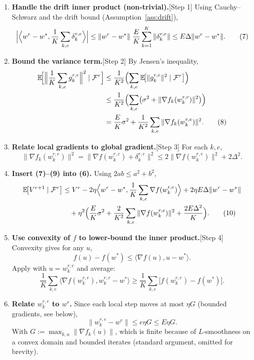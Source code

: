 \documentclass{article}
\newcommand{\E}{\mathbb{E}}
\begin{document}
\begin{enumerate}
\item \textbf{Handle the drift inner product (non‑trivial).}[Step 1]  
Using Cauchy–Schwarz and the drift bound (Assumption~\ref{ass:drift}),
\[
\Bigl|\Bigl\langle w^{r}-w^{*},\frac1K\sum_{k,e}\delta_{k}^{r,e}\Bigr\rangle\Bigr|
\le \|w^{r}-w^{*}\|\;\frac{E}{K}\sum_{k=1}^{K}\|\delta_{k}^{r,e}\|
\le E\Delta\|w^{r}-w^{*}\|.
\tag{7}
\]

\item \textbf{Bound the variance term.}[Step 2]  
By Jensen’s inequality,
\[
\begin{aligned}
\E\!\Bigl[\Bigl\|\frac1K\sum_{k,e}g_{k}^{r,e}\Bigr\|^{2}\mid\mathcal{F}^{r}\Bigr]
&\le \frac{1}{K^{2}}\Bigl(\sum_{k,e}\E\!\bigl[\|g_{k}^{r,e}\|^{2}\mid\mathcal{F}^{r}\bigr]\Bigr)\\
&\le \frac{1}{K^{2}}\Bigl(\sum_{k,e}\bigl(\sigma^{2}+\|\nabla f_k(w_{k}^{r,e})\|^{2}\bigr)\Bigr)\\
&= \frac{E}{K}\sigma^{2}
+\frac1{K^{2}}\sum_{k,e}\|\nabla f_k(w_{k}^{r,e})\|^{2}.
\tag{8}
\end{aligned}
\]

\item \textbf{Relate local gradients to global gradient.}[Step 3]  
For each $k,e$,
\[
\|\nabla f_k(w_{k}^{r,e})\|^{2}
= \|\nabla f(w_{k}^{r,e})+\delta_{k}^{r,e}\|^{2}
\le 2\|\nabla f(w_{k}^{r,e})\|^{2}+2\Delta^{2}.
\tag{9}
\]

\item \textbf{Insert (7)–(9) into (6).}  Using $2ab\le a^{2}+b^{2}$,
\[
\begin{aligned}
\E\!\bigl[V^{r+1}\mid\mathcal{F}^{r}\bigr]
&\le V^{r}
-2\eta\Bigl\langle w^{r}-w^{*},\frac1K\sum_{k,e}\nabla f(w_{k}^{r,e})\Bigr\rangle
+2\eta E\Delta\|w^{r}-w^{*}\|\\
&\quad+\eta^{2}\Bigl(\frac{E}{K}\sigma^{2}
+\frac{2}{K^{2}}\sum_{k,e}\|\nabla f(w_{k}^{r,e})\|^{2}
+ \frac{2E\Delta^{2}}{K}\Bigr).
\tag{10}
\end{aligned}
\]

\item \textbf{Use convexity of $f$ to lower‑bound the inner product.}[Step 4]  
Convexity gives for any $u$,
\[
f(u)-f(w^{*})\le \langle\nabla f(u),u-w^{*}\rangle.
\]
Apply with $u=w_{k}^{r,e}$ and average:
\[
\frac1K\sum_{k,e}\langle\nabla f(w_{k}^{r,e}),w_{k}^{r,e}-w^{*}\rangle
\ge \frac1K\sum_{k,e}\bigl[f(w_{k}^{r,e})-f(w^{*})\bigr].
\tag{11}
\]

\item \textbf{Relate $w_{k}^{r,e}$ to $w^{r}$.}  
Since each local step moves at most $\eta G$ (bounded gradients, see below),
\[
\|w_{k}^{r,e}-w^{r}\|\le e\eta G\le E\eta G.
\tag{12}
\]
With $G:=\max_{k,u}\|\nabla f_k(u)\|$, which is finite because of $L$‑smoothness on a convex domain and bounded iterates (standard argument, omitted for brevity).


\end{enumerate}
\end{document}
